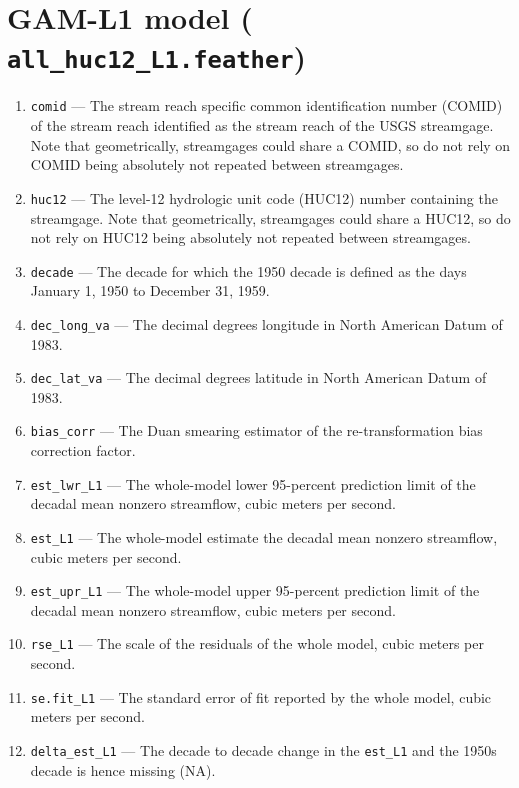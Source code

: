 \documentclass[1p, authoryear, 11pt, times, preprint]{elsarticle}
\newcommand{\code}[1]{{\color{black}%
                       \mbox{\lstinline[basicstyle={\small\ttfamily},
                                        keywordstyle=\scriptsize\ttfamily]|#1|}}}
\begin{document}
 


\section{GAM-L1 model (\code{all_huc12_L1.feather})}
\begin{enumerate}
\footnotesize
\RaggedRight
\item \code{comid} --- The stream reach specific common identification number (COMID) of the stream reach identified as the stream reach of the USGS streamgage. Note that geometrically, streamgages could share a COMID, so do not rely on COMID being absolutely not repeated between streamgages.
\item \code{huc12} --- The level-12 hydrologic unit code (HUC12) number containing the streamgage. Note that geometrically, streamgages could share a HUC12, so do not rely on HUC12 being absolutely not repeated between streamgages.
\item \code{decade} --- The decade for which the 1950 decade is defined as the days January 1, 1950 to December 31, 1959.
\item \code{dec_long_va} --- The decimal degrees longitude in North American Datum of 1983.
\item \code{dec_lat_va} --- The decimal degrees latitude in North American Datum of 1983.
\item \code{bias_corr} --- The Duan smearing estimator of the re-transformation bias correction factor.
\item \code{est_lwr_L1} --- The whole-model lower 95-percent prediction limit of the decadal mean nonzero streamflow, cubic meters per second.
\item \code{est_L1} --- The whole-model estimate the decadal mean nonzero streamflow, cubic meters per second.
\item \code{est_upr_L1} --- The whole-model upper 95-percent prediction limit of the decadal mean nonzero streamflow, cubic meters per second.
\item \code{rse_L1} --- The scale of the residuals of the whole model, cubic meters per second.
\item \code{se.fit_L1} --- The standard error of fit reported by the whole model, cubic meters per second.
\item \code{delta_est_L1} --- The decade to decade change in the \code{est_L1} and the 1950s decade is hence missing (NA).
\end{enumerate}

\end{document}
